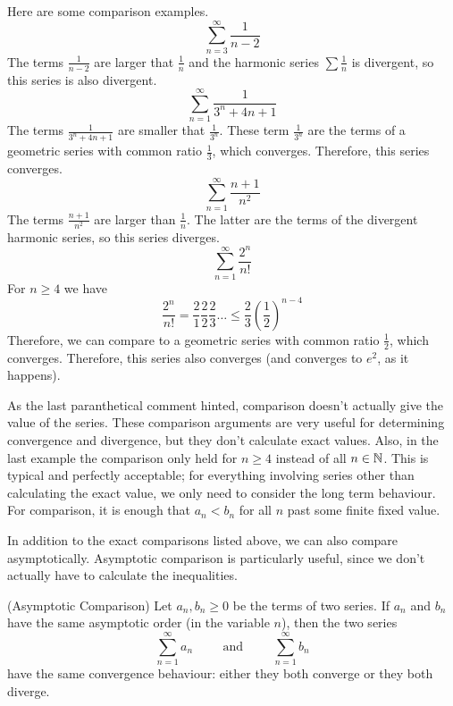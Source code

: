 \documentclass[fleqn]{report}
\begin{document}
\begin{example} Here are some comparison examples.
\label{example1}
\begin{equation*}
\sum_{n=3}^\infty \frac{1}{n-2}
\end{equation*}
The terms $\frac{1}{n-2}$ are larger that $\frac{1}{n}$ and
the harmonic series $\sum \frac{1}{n}$ is divergent, so this
series is also divergent.
\begin{equation*}
\sum_{n=1}^\infty \frac{1}{3^n + 4n + 1}
\end{equation*}
The terms $\frac{1}{3^n + 4n + 1}$ are smaller that
$\frac{1}{3^n}$. These term $\frac{1}{3^n}$ are the terms of a geometric
series with common ratio $\frac{1}{3}$, which
converges. Therefore, this series converges.
\begin{equation*}
\sum_{n=1}^\infty \frac{n+1}{n^2}
\end{equation*}
The terms $\frac{n+1}{n^2}$ are larger than $\frac{1}{n}$. The
latter are the terms of the divergent harmonic series, so this
series diverges.
\begin{equation*}
\sum_{n=1}^\infty \frac{2^n}{n!}
\end{equation*}
For $n \geq 4$ we have
\begin{equation*}
\frac{2^n}{n!} = \frac{2}{1} \frac{2}{2} \frac{2}{3} \ldots \leq
\frac{2}{3} \left( \frac{1}{2} \right)^{n-4}
\end{equation*}
Therefore, we can compare to a geometric series with
common ratio $\frac{1}{2}$, which converges. Therefore, this
series also converges (and converges to $e^2$, as it happens).
\end{example}

As the last paranthetical comment hinted, comparison doesn't
actually give the value of the series. These comparison
arguments are very useful for determining convergence and
divergence, but they don't calculate exact values. Also, in
the last example the comparison only held for $n \geq 4$
instead of all $n \in \mathbb{N}$. This is typical and perfectly
acceptable; for everything involving series other than
calculating the exact value, we only need to consider the long
term behaviour. For comparison, it is enough that $a_n < b_n$
for all $n$ past some finite fixed value. 

In addition to the exact comparisons listed above, we can also
compare asymptotically. Asymptotic comparison is particularly
useful, since we don't actually have to calculate the
inequalities.

\begin{prop}(Asymptotic Comparison) Let $a_n,b_n \geq 0$ be
the terms of two series. If $a_n$ and $b_n$ have the same
asymptotic order (in the variable $n$), then the two series
\begin{equation*}
\sum_{n=1}^\infty a_n \hspace{1cm} \text{and} \hspace{1cm}
\sum_{n=1}^\infty b_n
\end{equation*}
have the same convergence behaviour: either they both converge
or they both diverge. 
\end{prop}
\end{document}
